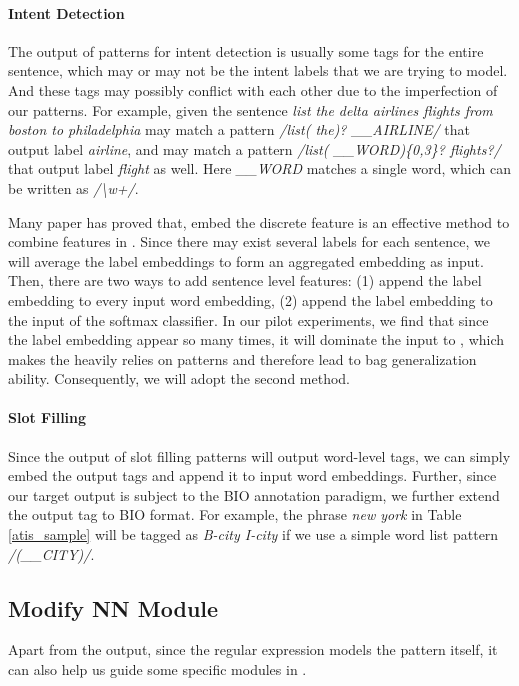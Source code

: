 \paragraph{Intent Detection}
The output of \RE patterns for intent detection is usually some tags for the entire sentence, which may or may not be the intent labels that we are trying to model. And these tags may possibly conflict with each other due to the imperfection of our patterns. 
For example, given the sentence \emph{list the delta airlines flights from boston to philadelphia} may match a pattern \textsl{/list( the)? \_\_AIRLINE/} that output label \emph{airline}, and may match a pattern \textsl{/list( \_\_WORD)\{0,3\}? flights?/} that output label \emph{flight} as well. Here \emph{\_\_WORD} matches a single word, which can be written as \textsl{/\textbackslash w+/}.

Many paper has proved that, embed the discrete feature is an effective method to combine features in \NN \cite{zeng2014relation, guo2017deepfm}. Since there may exist several labels for each sentence, we will average the label embeddings to form an aggregated embedding as input. 
Then, there are two ways to add sentence level features: (1) append the label embedding to every input word embedding, (2) append the label embedding to the input of the softmax classifier. In our pilot experiments, we find that since the label embedding appear so many times, it will dominate the input to \NN, which makes the \NN heavily relies on \RE patterns and therefore lead to bag generalization ability. Consequently, we will adopt the second method.


\paragraph{Slot Filling}
Since the output of slot filling \RE patterns will output word-level tags, we can simply embed the output tags and append it to input word embeddings. Further, since our target output is subject to the BIO annotation paradigm, we further extend the output tag to BIO format. For example, the phrase \emph{new york} in Table \ref{atis_sample} will be tagged as \emph{B-city I-city} if we use a simple word list pattern \textsl{/(\_\_CITY)/}.

\subsection{Modify NN Module}
Apart from the \RE output, since the regular expression models the pattern itself, it can also help us guide some specific modules in \NN. 

